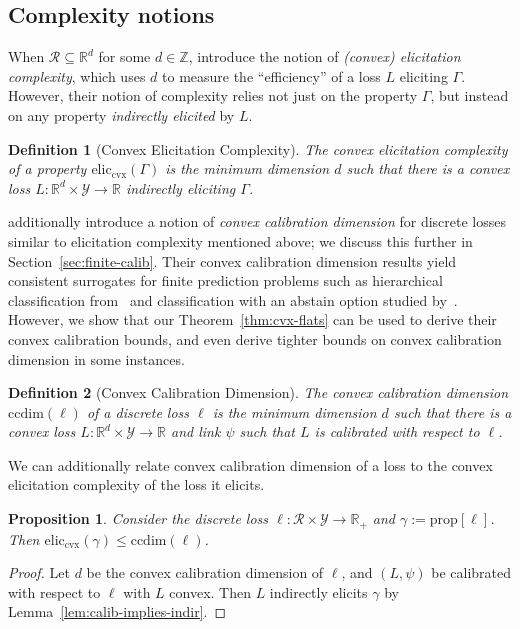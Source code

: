 \documentclass{article}
\newcommand{\reals}{\mathbb{R}}
\newcommand{\prop}[1]{\mathrm{prop}[#1]}
\newcommand{\eliccvx}{\mathrm{elic}_\mathrm{cvx}}
\newcommand{\ccdim}{\mathrm{ccdim}}
\newcommand{\R}{\mathcal{R}}
\newcommand{\Y}{\mathcal{Y}}
\newtheorem{proposition}{Proposition}
\newtheorem{definition}{Definition}
\begin{document}
\subsection{Complexity notions}\label{subsec:complexity}
When $\R \subseteq \reals^d$ for some $d \in \mathbb{Z}$, \cite{frongillo2018elicitation} introduce the notion of \emph{(convex) elicitation complexity}, which uses $d$ to measure the ``efficiency'' of a loss $L$ eliciting $\Gamma$.
However, their notion of complexity relies not just on the property $\Gamma$, but instead on any property \emph{indirectly elicited} by $L$.
\begin{definition}[Convex Elicitation Complexity]
	The \emph{convex elicitation complexity} of a property $\eliccvx(\Gamma)$ is the minimum dimension $d$ such that there is a convex loss $L : \reals^d \times \Y \to \reals$ indirectly eliciting $\Gamma$.
\end{definition}

\cite{ramaswamy2016convex} additionally introduce a notion of \emph{convex calibration dimension} for discrete losses similar to elicitation complexity mentioned above; we discuss this further in Section~\ref{sec:finite-calib}.
Their convex calibration dimension results yield consistent surrogates for finite prediction problems such as hierarchical classification from~\cite{ramaswamy2015hierarchical} and classification with an abstain option studied by~\cite{ramaswamy2018consistent}.
However, we show that our Theorem~\ref{thm:cvx-flats} can be used to derive their convex calibration bounds, and even derive tighter bounds on convex calibration dimension in some instances.

\begin{definition}[Convex Calibration Dimension]
	The \emph{convex calibration dimension} $\ccdim(\ell)$ of a discrete loss $\ell$ is the minimum dimension $d$ such that there is a convex loss $L: \reals^d \times \Y \to \reals$ and link $\psi$ such that $L$ is calibrated with respect to $\ell$.
\end{definition}

We can additionally relate convex calibration dimension of a loss to the convex elicitation complexity of the loss it elicits.
\begin{proposition}
	Consider the discrete loss $\ell : \R \times \Y \to \reals_+$ and $\gamma:= \prop{\ell}$.
	Then $\eliccvx(\gamma) \leq \ccdim(\ell)$.
\end{proposition}
\begin{proof}
	Let $d$ be the convex calibration dimension of $\ell$, and $(L, \psi)$ be calibrated with respect to $\ell$ with $L$ convex.
	Then $L$ indirectly elicits $\gamma$ by Lemma~\ref{lem:calib-implies-indir}.
\end{proof}
\end{document}
